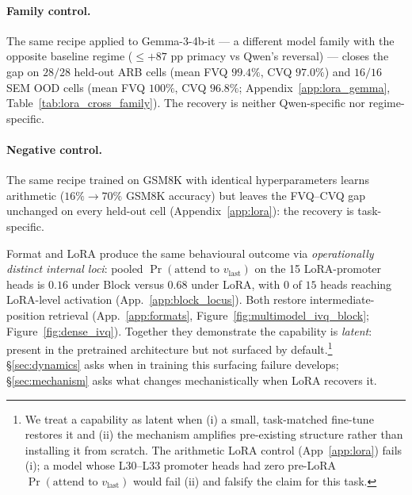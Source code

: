 \documentclass[11pt]{article}
\begin{document}
\paragraph{Family control.} The same recipe applied to
Gemma-3-4b-it --- a different model family with the opposite
baseline regime ($\le {+}87$ pp primacy vs Qwen's reversal) ---
closes the gap on $28/28$ held-out ARB cells (mean FVQ $99.4\%$,
CVQ $97.0\%$) and $16/16$ SEM OOD cells (mean FVQ $100\%$,
CVQ $96.8\%$; Appendix~\ref{app:lora_gemma}, Table~\ref{tab:lora_cross_family}). The recovery is
neither Qwen-specific nor regime-specific.

\paragraph{Negative control.} The same recipe trained on GSM8K
with identical hyperparameters learns arithmetic
($16\% \to 70\%$ GSM8K accuracy) but leaves the FVQ--CVQ gap
unchanged on every held-out cell (Appendix~\ref{app:lora}): the
recovery is task-specific.

Format and LoRA produce the same behavioural outcome via
\emph{operationally distinct internal loci}: pooled
$\Pr(\text{attend to }v_{\text{last}})$ on the 15 LoRA-promoter
heads is $0.16$ under Block versus $0.68$ under LoRA, with $0$ of
$15$ heads reaching LoRA-level activation
(App.~\ref{app:block_locus}). Both restore intermediate-position
retrieval (App.~\ref{app:formats},
Figure~\ref{fig:multimodel_ivq_block};
Figure~\ref{fig:dense_ivq}). Together they demonstrate the
capability is \emph{latent}: present in the pretrained architecture
but not surfaced by default.\footnote{We treat a capability as latent when
(i) a small, task-matched fine-tune restores it and (ii) the
mechanism amplifies pre-existing structure rather than installing it
from scratch. The arithmetic LoRA control (App~\ref{app:lora})
fails (i); a model whose L30--L33 promoter heads had zero pre-LoRA
$\Pr(\text{attend to }v_{\text{last}})$ would fail (ii) and falsify
the claim for this task.}
\S\ref{sec:dynamics} asks when in training this surfacing failure
develops; \S\ref{sec:mechanism} asks what changes mechanistically
when LoRA recovers it.
\end{document}
